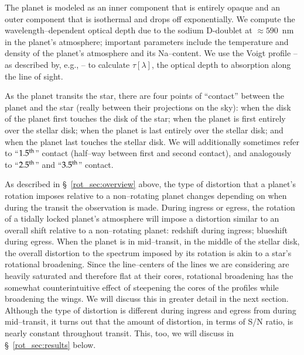 The planet is modeled as an inner component that is entirely opaque
and an outer component that is isothermal and drops off
exponentially. We compute the wavelength--dependent optical depth due
to the sodium D-doublet at $\approx 590$~nm in the planet's
atmosphere; important parameters include the temperature and density
of the planet's atmosphere and its Na--content.  We use the Voigt
profile -- as described by, e.g., \citet{press+rybicki1993} -- to
calculate $\tau[\lambda]$, the optical depth to absorption along the
line of sight.

As the planet transits the star, there are four points of ``contact''
between the planet and the star (really between their projections on
the sky): when the disk of the planet first touches the disk of the
star; when the planet is first entirely over the stellar disk; when
the planet is last entirely over the stellar disk; and when the planet
last touches the stellar disk.  We will additionally sometimes refer
to ``$1.5^{\rm th}$'' contact (half--way between first and second
contact), and analogously to ``$2.5^{\rm th}$'' and ``$3.5^{\rm th}$''
contact.

As described in \S~\ref{rot_sec:overview} above, the type of
distortion that a planet's rotation imposes relative to a
non--rotating planet changes depending on when during the transit the
observation is made.  During ingress or egress, the rotation of a
tidally locked planet's atmosphere will impose a distortion similar to
an overall shift relative to a non--rotating planet: redshift during
ingress; blueshift during egress.  When the planet is in mid--transit,
in the middle of the stellar disk, the overall distortion to the
spectrum imposed by its rotation is akin to a star's rotational
broadening.  Since the line--centers of the lines we are considering
are heavily saturated and therefore flat at their cores, rotational
broadening has the somewhat counterintuitive effect of steepening the
cores of the profiles while broadening the wings.  We will discuss
this in greater detail in the next section.  Although the type of
distortion is different during ingress and egress from during
mid--transit, it turns out that the amount of distortion, in terms of
S/N ratio, is nearly constant throughout transit.  This, too, we will
discuss in \S~\ref{rot_sec:results} below.


